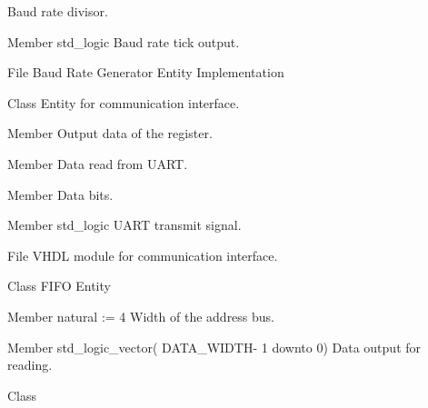 \begin{DoxyRefList}
Baud rate divisor. 
\item[Member \doxylink{classbaud__gen_a44e47ddb8ef04ddc92f33575b084e05a}{baud\+\_\+gen.tick} std\+\_\+logic ]\label{brief__brief000053}%
%
 Baud rate tick output.  
\item[File \doxylink{baud__gen_8vhdl}{baud\+\_\+gen.vhdl} ]\label{brief__brief000050}%
%
 Baud Rate Generator Entity Implementation 
\item[Class \doxylink{classcomm__interface}{comm\+\_\+interface} ]\label{brief__brief000084}%
%
 Entity for communication interface.  
\item[Member \doxylink{classcomm__interface_1_1behavioral_a866ed29475d4663ccbdaa470c4846b27}{comm\+\_\+interface.behavioral.rd\+\_\+uart} ]\label{brief__brief000088}%
%
 Output data of the register.  
\item[Member \doxylink{classcomm__interface_1_1behavioral_abb1f4b1077fed42215491ace6164cf2c}{comm\+\_\+interface.behavioral.register\+\_\+d} ]\label{brief__brief000087}%
%
 Data read from UART.  
\item[Member \doxylink{classcomm__interface_1_1behavioral_a169d0b4cc1e83e6cfd48bb4d8fb324fd}{comm\+\_\+interface.behavioral.uart} ]\label{brief__brief000086}%
%
 Data bits.  
\item[Member \doxylink{classcomm__interface_a98dd33b35444db986d99130a0fecc550}{comm\+\_\+interface.tx} std\+\_\+logic ]\label{brief__brief000085}%
%
 UART transmit signal.  
\item[File \doxylink{comm__interface_8vhdl}{comm\+\_\+interface.vhdl} ]\label{brief__brief000083}%
%
 VHDL module for communication interface.  
\item[Class \doxylink{classfifo}{fifo} ]\label{brief__brief000023}%
%
 FIFO Entity 
\item[Member \doxylink{classfifo_a97ed8c4ac7d6de2665dc3b2d8ab90ea3}{fifo.ADDR\+\_\+\+WIDTH} natural \+:= 4]\label{brief__brief000024}%
%
 Width of the address bus.  
\item[Member \doxylink{classfifo_a36d8aa71ffe3ac859b8553aaf2542c20}{fifo.r\+\_\+data} std\+\_\+logic\+\_\+vector( DATA\+\_\+\+WIDTH-\/ 1 downto 0) ]\label{brief__brief000025}%
%
 Data output for reading.  
\item[Class \doxylink{classfifo_1_1structural}{fifo.structural} ]\label{brief__brief000026}%

\end{DoxyRefList}
